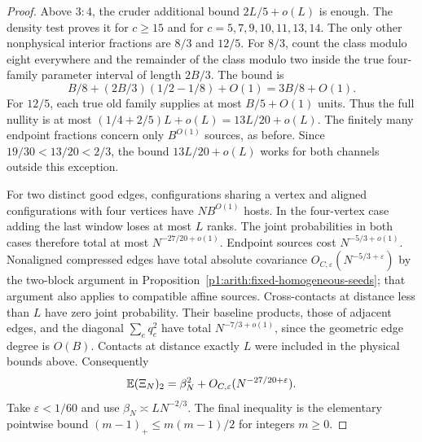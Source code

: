 \begin{proof}
Above $3:4$, the cruder additional bound $2L/5+o(L)$ is enough.
The density test proves it for $c\geq15$ and for
$c=5,7,9,10,11,13,14$.  The only other nonphysical interior
fractions are $8/3$ and $12/5$.
For $8/3$, count the class modulo eight everywhere and the remainder
of the class modulo two inside the true four-family parameter
interval of length $2B/3$.  The bound is
\[
 B/8+(2B/3)(1/2-1/8)+O(1)=3B/8+O(1).
\]
For $12/5$, each true old family supplies at most $B/5+O(1)$ units.
Thus the full nullity is at most $(1/4+2/5)L+o(L)=13L/20+o(L)$.
The finitely many endpoint fractions concern only $B^{O(1)}$ sources,
as before.  Since $19/30<13/20<2/3$, the bound $13L/20+o(L)$
works for both channels outside this exception.

For two distinct good edges, configurations sharing a vertex and
aligned configurations with four vertices have $NB^{O(1)}$ hosts.
In the four-vertex case adding the last window loses at most $L$
ranks.  The joint probabilities in both cases therefore total at most
$N^{-27/20+o(1)}$.  Endpoint sources cost $N^{-5/3+o(1)}$.
Nonaligned compressed edges have total absolute covariance
$O_{C,\varepsilon}(N^{-5/3+\varepsilon})$ by the two-block argument in
Proposition~\ref{p1:arith:fixed-homogeneous-seeds}; that argument also
applies to compatible affine sources.
Cross-contacts at distance less than $L$ have zero joint probability.
Their baseline products, those of adjacent edges, and the diagonal
$\sum_e q_e^2$ have total $N^{-7/3+o(1)}$, since the geometric edge
degree is $O(B)$.  Contacts at distance exactly $L$ were included in
the physical bounds above.  Consequently
\[
 \mathbb E(\Xi_N)_2=\beta_N^2+O_{C,\varepsilon}(N^{-27/20+\varepsilon}).
\]
Take $\varepsilon<1/60$ and use
$\beta_N\asymp LN^{-2/3}$.  The final inequality is the elementary
pointwise bound $(m-1)_+\leq m(m-1)/2$ for integers $m\geq0$.
\end{proof}

